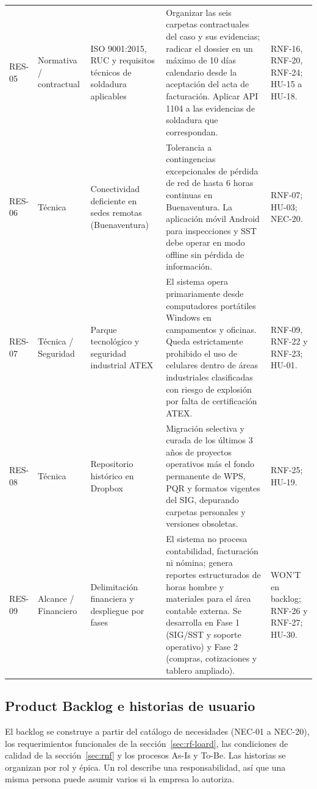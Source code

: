 \documentclass[12pt,letterpaper]{article}
\newcommand{\nec}[1]{\mbox{NEC-#1}}                       %
\begin{document}
{\begin{longtable}{@{}L{1.8cm} L{1.8cm} L{3.3cm} L{5.0cm} L{2.8cm}@{}}
\addlinespace
RES-05 & Normativa / contractual & ISO 9001:2015, RUC y requisitos técnicos de soldadura aplicables & Organizar las seis carpetas contractuales del caso y sus evidencias; radicar el dossier en un máximo de 10 días calendario desde la aceptación del acta de facturación. Aplicar API 1104 a las evidencias de soldadura que correspondan. & RNF-16, RNF-20, RNF-24; HU-15 a HU-18. \\
\addlinespace
RES-06 & Técnica & Conectividad deficiente en sedes remotas (Buenaventura) & Tolerancia a contingencias excepcionales de pérdida de red de hasta 6 horas continuas en Buenaventura. La aplicación móvil Android para inspecciones y SST debe operar en modo offline sin pérdida de información. & RNF-07; HU-03; \nec{20}. \\
\addlinespace
RES-07 & Técnica / Seguridad & Parque tecnológico y seguridad industrial ATEX & El sistema opera primariamente desde computadores portátiles Windows en campamentos y oficinas. Queda estrictamente prohibido el uso de celulares dentro de áreas industriales clasificadas con riesgo de explosión por falta de certificación ATEX. & RNF-09, RNF-22 y RNF-23; HU-01. \\
\addlinespace
RES-08 & Técnica & Repositorio histórico en Dropbox & Migración selectiva y curada de los últimos 3 años de proyectos operativos más el fondo permanente de WPS, PQR y formatos vigentes del SIG, depurando carpetas personales y versiones obsoletas. & RNF-25; HU-19. \\
\addlinespace
RES-09 & Alcance / Financiero & Delimitación financiera y despliegue por fases & El sistema no procesa contabilidad, facturación ni nómina; genera reportes estructurados de horas hombre y materiales para el área contable externa. Se desarrolla en Fase 1 (SIG/SST y soporte operativo) y Fase 2 (compras, cotizaciones y tablero ampliado). & WON'T en backlog; RNF-26 y RNF-27; HU-30. \\
\end{longtable}
}

\subsection{Product Backlog e historias de usuario}

\label{sec:pb-loard}
El backlog se construye a partir del catálogo de necesidades (\nec{01} a \nec{20}), los requerimientos funcionales de la sección~\ref{sec:rf-loard}, las condiciones de calidad de la sección~\ref{sec:rnf} y los procesos As-Is y To-Be. Las historias se organizan por rol y épica. Un rol describe una responsabilidad, así que una misma persona puede asumir varios si la empresa lo autoriza.
\end{document}
